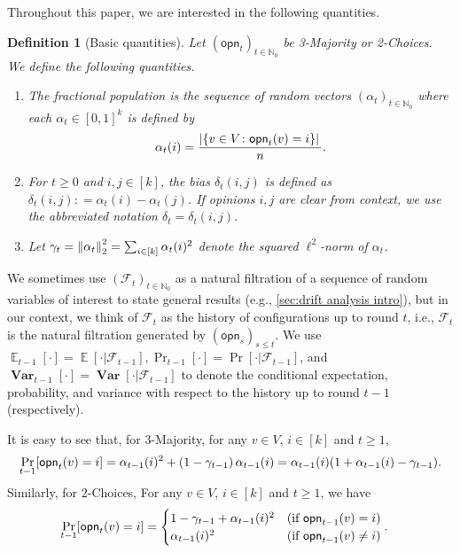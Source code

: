 \documentclass[letterpaper,11pt]{article}
\newtheorem{definition}[theorem]{Definition}
\def\defeq{\mathrel{\mathop:}=}
\DeclarePairedDelimiter{\rbra}{\lparen}{\rparen} %
\DeclarePairedDelimiter{\sbra}{\lbrack}{\rbrack} %
\DeclareMathOperator*{\E}{\mathbb{E}}
\DeclareMathOperator*{\Var}{\mathbf{Var}}
\newcommand{\Nat}{\mathbb{N}}
\newcommand{\calF}{\mathcal{F}}
\newcommand{\alphanorm}{\gamma}
\newcommand{\opinion}{\mathsf{opn}}
\begin{document}
  Throughout this paper, we are interested in the following quantities.
  \begin{definition}[Basic quantities] \label{def:basic quantities}
    Let $(\opinion_t)_{t\in \Nat_0}$ be 3-Majority or 2-Choices.
    We define the following quantities.
\begin{enumerate}
  \renewcommand{\labelenumi}{(\roman{enumi})}
    \item  The \emph{fractional population} is the sequence of random vectors $(\alpha_t)_{t\in\Nat_0}$ where each $\alpha_t\in[0,1]^k$ is defined by
  \[
      \alpha_t(i) = \frac{\abs*{\{v\in V\colon \opinion_t(v)=i\}}}{n}.
  \]
  \item For $t\ge 0$ and $i,j\in[k]$, the \emph{bias} $\delta_t(i,j)$ is defined as $\delta_t(i,j) \defeq \alpha_t(i) - \alpha_t(j)$. If opinions $i,j$ are clear from context, we use the abbreviated notation $\delta_t=\delta_t(i,j)$.
  \item Let $\gamma_t=\norm{\alpha_t}^2_2=\sum_{i\in [k]}\alpha_t(i)^2$ denote the squared $\ell^2$-norm of $\alpha_t$.
\end{enumerate}
  \end{definition}

  We sometimes use $(\calF_t)_{t\in\Nat_0}$ as a natural filtration of a sequence of random variables of interest to state general results (e.g., \cref{sec:drift analysis intro}), but in our context, we think of $\calF_t$ as the history of configurations up to round $t$, i.e., $\calF_t$ is the natural filtration generated by $(\opinion_s)_{s\le t}$.
  We use $\E_{t-1}[\cdot]=\E[\cdot | \mathcal{F}_{t-1}],\Pr_{t-1}[\cdot]=\Pr[\cdot | \mathcal{F}_{t-1}]$, and $\Var_{t-1}[\cdot]=\Var[\cdot | \mathcal{F}_{t-1}]$ to denote the conditional expectation, probability, and variance with respect to the history up to round $t-1$ (respectively).

  It is easy to see that, for 3-Majority, for any $v\in V$, $i\in [k]$ and $t\geq 1$, 
  \begin{align}
      \Pr_{t-1}\sbra*{\opinion_t(v)=i}
      =\alpha_{t-1}(i)^2+\left(1-\alphanorm_{t-1}\right)\alpha_{t-1}(i)
      =\alpha_{t-1}(i)\rbra*{1+\alpha_{t-1}(i)-\alphanorm_{t-1}}.
      \label{eq:updating probability for 3Majority}
  \end{align}
  Similarly, for 2-Choices, 
  For any $v\in V$, $i\in [k]$ and $t\geq 1$, we have
  \begin{align}
      \label{eq:updating probability for 2 choices}
      \Pr_{t-1}\sbra*{\opinion_t(v)=i}
      &=\begin{cases}
          1-\alphanorm_{t-1}+\alpha_{t-1}(i)^2 & (\textrm{if }\opinion_{t-1}(v)=i)\\
          \alpha_{t-1}(i)^2 & (\textrm{if }\opinion_{t-1}(v)\neq i)
      \end{cases}.
  \end{align}
\end{document}
